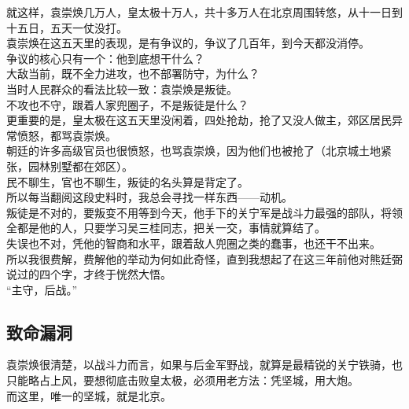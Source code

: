 \begin{multicols}{\theparacolNo}
就这样，袁崇焕几万人，皇太极十万人，共十多万人在北京周围转悠，从十一日到十五日，五天一仗没打。\\

袁崇焕在这五天里的表现，是有争议的，争议了几百年，到今天都没消停。\\

争议的核心只有一个：他到底想干什么？\\

大敌当前，既不全力进攻，也不部署防守，为什么？\\

当时人民群众的看法比较一致：袁崇焕是叛徒。\\

不攻也不守，跟着人家兜圈子，不是叛徒是什么？\\

更重要的是，皇太极在这五天里没闲着，四处抢劫，抢了又没人做主，郊区居民异常愤怒，都骂袁崇焕。\\

朝廷的许多高级官员也很愤怒，也骂袁崇焕，因为他们也被抢了（北京城土地紧张，园林别墅都在郊区）。\\

民不聊生，官也不聊生，叛徒的名头算是背定了。\\

所以每当翻阅这段史料时，我总会寻找一样东西——动机。\\

叛徒是不对的，要叛变不用等到今天，他手下的关宁军是战斗力最强的部队，将领全都是他的人，只要学习吴三桂同志，把关一交，事情就算结了。\\

失误也不对，凭他的智商和水平，跟着敌人兜圈之类的蠢事，也还干不出来。\\

所以我很费解，费解他的举动为何如此奇怪，直到我想起了在这三年前他对熊廷弼说过的四个字，才终于恍然大悟。\\

“主守，后战。”\\

\subsection{致命漏洞}
袁崇焕很清楚，以战斗力而言，如果与后金军野战，就算是最精锐的关宁铁骑，也只能略占上风，要想彻底击败皇太极，必须用老方法：凭坚城，用大炮。\\

而这里，唯一的坚城，就是北京。\\


\end{multicols}
